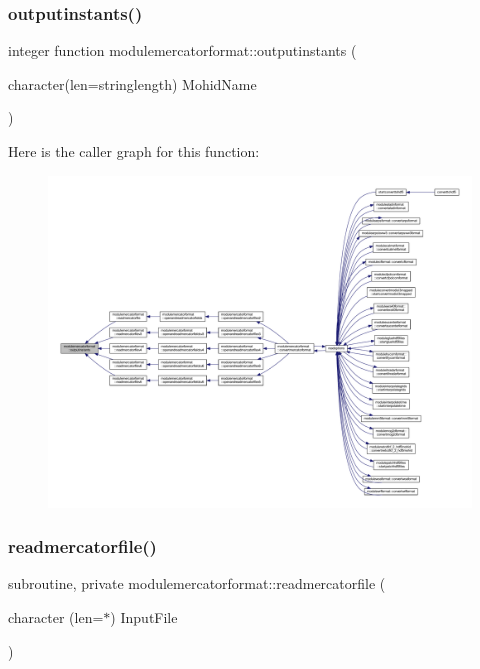 \mbox{\label{namespacemodulemercatorformat_ab6a85f957c668b2ecb52cea10902d0e7}} 
\subsubsection{\texorpdfstring{outputinstants()}{outputinstants()}}
{\footnotesize\ttfamily integer function modulemercatorformat\+::outputinstants (\begin{DoxyParamCaption}\item[{character(len=stringlength)}]{Mohid\+Name }\end{DoxyParamCaption})\hspace{0.3cm}{\ttfamily [private]}}

Here is the caller graph for this function\+:\nopagebreak
\begin{figure}[H]
\begin{center}
\leavevmode
\includegraphics[width=350pt]{namespacemodulemercatorformat_ab6a85f957c668b2ecb52cea10902d0e7_icgraph}
\end{center}
\end{figure}
\mbox{\label{namespacemodulemercatorformat_a2f894929004ec4d27c855864f3122541}} 
\subsubsection{\texorpdfstring{readmercatorfile()}{readmercatorfile()}}
{\footnotesize\ttfamily subroutine, private modulemercatorformat\+::readmercatorfile (\begin{DoxyParamCaption}\item[{character (len=$\ast$)}]{Input\+File }\end{DoxyParamCaption})\hspace{0.3cm}{\ttfamily [private]}}

